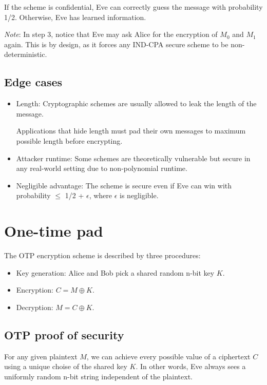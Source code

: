 If the scheme is confidential, Eve can correctly guess the message with probability 1/2. Otherwise, Eve has learned information.

\medskip

\emph{Note}: In step 3, notice that Eve may ask Alice for the encryption of $M_0$ and $M_1$ again. This is by design, as it forces any IND-CPA secure scheme to be non-deterministic.

\subsection{Edge cases}
\begin{itemize}
    \item Length: Cryptographic schemes are usually allowed to leak the length of the message.
    
    Applications that hide length must pad their own messages to maximum possible length before encrypting.
    
    \item Attacker runtime: Some schemes are theoretically vulnerable but secure in any real-world setting due to non-polynomial runtime.
    
    \item Negligible advantage: The scheme is secure even if Eve can win with probability $\leq$ 1/2 + $\epsilon$, where $\epsilon$ is negligible.
\end{itemize}

\section{One-time pad}
The OTP encryption scheme is described by three procedures:
\begin{itemize}
    \item Key generation: Alice and Bob pick a shared random n-bit key $K$.
    \item Encryption: $C = M \oplus K$.
    \item Decryption: $M = C \oplus K$.
\end{itemize}

\subsection{OTP proof of security}
For any given plaintext $M$, we can achieve every possible value of a ciphertext $C$ using a unique choise of the shared key $K$. In other words, Eve always sees a uniformly random n-bit string independent of the plaintext.

